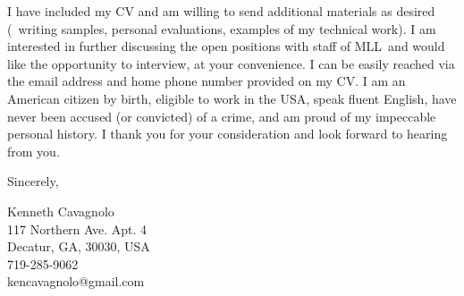 \documentclass[12pt,letterpaper]{article}
\newcommand{\accro}{MLL}
\begin{document}
I have included my CV and am willing to send additional materials as
desired (\eg\ writing samples, personal evaluations, examples of my
technical work). I am interested in further discussing the open
positions with staff of \accro\ and would like the opportunity to
interview, at your convenience. I can be easily reached via the email
address and home phone number provided on my CV. I am an American
citizen by birth, eligible to work in the USA, speak fluent English,
have never been accused (or convicted) of a crime, and am proud of my
impeccable personal history. I thank you for your consideration and
look forward to hearing from you.

Sincerely,\\
\begin{minipage}{7.5in}
\end{minipage}
Kenneth Cavagnolo\\
117 Northern Ave. Apt. 4\\
Decatur, GA, 30030, USA\\
719-285-9062\\
kencavagnolo@gmail.com
\end{document}
